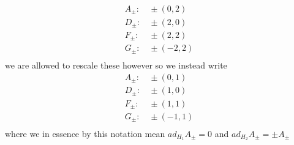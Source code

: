 \documentclass[a4paper,12pt]{article}
\begin{document}
\begin{equation}
	\begin{aligned}
		A_\pm:& \,\pm (0,2)\\
		D_\pm:& \,\pm (2,0)\\
		F_\pm:& \,\pm (2,2)\\
		G_\pm:& \,\pm (-2,2)\\
	\end{aligned}
\end{equation} 
we are allowed to rescale these however so we instead write
\begin{equation}
	\begin{aligned}
		A_\pm:& \,\pm (0,1)\\
		D_\pm:& \,\pm (1,0)\\
		F_\pm:& \,\pm (1,1)\\
		G_\pm:& \,\pm (-1,1)\\
	\end{aligned}
\end{equation} 
where we in essence by this notation mean $ad_{H_1}A_\pm=0$ and $ad_{H_2}A_\pm=\pm A_\pm$
\end{document}
